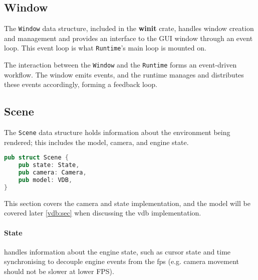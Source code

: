 \subsection{Window}
The \verb|Window| data structure, included in the \textbf{winit}\supercite{winit:doc} crate, handles window creation and management and provides an interface to the GUI window through an event loop. This event loop is what \verb|Runtime|'s main loop is mounted on.

The interaction between the \verb|Window| and the \verb|Runtime| forms an event-driven workflow. The window emits events, and the runtime manages and distributes these events accordingly, forming a feedback loop.

\subsection{Scene}\label{scene:def}
The \verb|Scene| data structure holds information about the environment being rendered; this includes the model, camera, and engine state.

\begin{lstlisting}[language=rust,caption={Scene definition},captionpos=b]
pub struct Scene {
    pub state: State,
    pub camera: Camera,
    pub model: VDB,
}
\end{lstlisting}

This section covers the camera and state implementation, and the model will be covered later \cref{vdb:sec} when discussing the \acrshort{vdb} implementation.

\paragraph{State} handles information about the engine state, such as cursor state and time synchronising to decouple engine events from the \acrshort{fps} (e.g. camera movement should not be slower at lower FPS).

